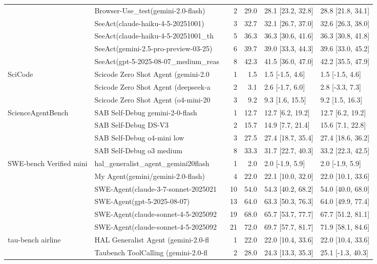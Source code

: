 \begin{longtable}{llrrll}
 & Browser-Use\_test(gemini-2.0-flash) & 2 & 29.0 & 28.1 [23.2, 32.8] & 28.8 [21.8, 34.1] \\
 & SeeAct(claude-haiku-4-5-20251001) & 3 & 32.7 & 32.1 [26.7, 37.0] & 32.6 [26.3, 38.0] \\
 & SeeAct(claude-haiku-4-5-20251001\_th~ & 5 & 36.3 & 36.3 [30.6, 41.6] & 36.3 [30.8, 41.8] \\
 & SeeAct(gemini-2.5-pro-preview-03-25) & 6 & 39.7 & 39.0 [33.3, 44.3] & 39.6 [33.0, 45.2] \\
 & SeeAct(gpt-5-2025-08-07\_medium\_reas~ & 8 & 42.3 & 41.5 [36.0, 47.0] & 42.2 [35.5, 47.9] \\
SciCode & Scicode Zero Shot Agent (gemini-2.0~ & 1 & 1.5 & 1.5 [-1.5, 4.6] & 1.5 [-1.5, 4.6] \\
 & Scicode Zero Shot Agent (deepseek-a~ & 2 & 3.1 & 2.6 [-1.7, 6.0] & 2.8 [-3.3, 7.3] \\
 & Scicode Zero Shot Agent (o4-mini-20~ & 3 & 9.2 & 9.3 [1.6, 15.5] & 9.2 [1.5, 16.3] \\
ScienceAgentBench & SAB Self-Debug gemini-2-0-flash & 1 & 12.7 & 12.7 [6.2, 19.2] & 12.7 [6.2, 19.2] \\
 & SAB Self-Debug DS-V3 & 2 & 15.7 & 14.9 [7.7, 21.4] & 15.6 [7.1, 22.8] \\
 & SAB Self-Debug o4-mini low & 3 & 27.5 & 27.4 [18.7, 35.4] & 27.4 [18.6, 36.2] \\
 & SAB Self-Debug o3 medium & 8 & 33.3 & 31.7 [22.7, 40.3] & 33.2 [22.3, 42.5] \\
SWE-bench Verified mini & hal\_generalist\_agent\_gemini20flash & 1 & 2.0 & 2.0 [-1.9, 5.9] & 2.0 [-1.9, 5.9] \\
 & My Agent(gemini/gemini-2.0-flash) & 4 & 22.0 & 22.1 [10.0, 32.0] & 22.0 [10.1, 33.6] \\
 & SWE-Agent(claude-3-7-sonnet-2025021~ & 10 & 54.0 & 54.3 [40.2, 68.2] & 54.0 [40.0, 68.0] \\
 & SWE-Agent(gpt-5-2025-08-07) & 13 & 64.0 & 63.3 [50.3, 76.3] & 64.0 [49.9, 77.4] \\
 & SWE-Agent(claude-sonnet-4-5-2025092~ & 19 & 68.0 & 65.7 [53.7, 77.7] & 67.7 [51.2, 81.1] \\
 & SWE-Agent(claude-sonnet-4-5-2025092~ & 21 & 72.0 & 69.7 [57.7, 81.7] & 71.9 [58.1, 84.6] \\
tau-bench airline & HAL Generalist Agent (gemini-2.0-fl~ & 1 & 22.0 & 22.0 [10.4, 33.6] & 22.0 [10.4, 33.6] \\
 & Taubench ToolCalling (gemini-2.0-fl~ & 2 & 28.0 & 24.3 [13.3, 35.3] & 25.1 [-1.3, 40.3] \\

\end{longtable}
